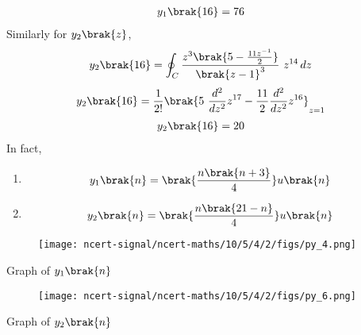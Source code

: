 \documentclass[journal,12pt,twocolumn]{IEEEtran}
\theoremstyle{remark}
\begin{document}
\begin{align}
y_1\brak{16}&=76
\end{align}
Similarly for $y_2\brak{z}$,
\begin{align}
y_2\brak{16}&=\oint_C \frac{z^3\brak{5-\frac{11z^{-1}}{2}}}{\brak{z-1}^3}\ z^{14}\, dz
\end{align}
\begin{align}
y_2\brak{16}&=\frac{1}{2!}\brak{5\ \frac{d^2}{dz^2}z^{17}-\frac{11}{2}\frac{d^2}{dz^2}z^{16}}_{z=1}  
\end{align}
\begin{align}
y_2\brak{16}&=20
\end{align}
In fact,\\
    \begin{enumerate}
    \item
    \begin{align}
        y_1\brak{n}&=\brak{\frac{n\brak{n+3}}{4}}u\brak{n}
    \end{align}
    \item
    \begin{align}
        y_2\brak{n}&=\brak{\frac{n\brak{21-n}}{4}}u\brak{n}
    \end{align}
\end{enumerate}
\begin{figure}[h]
    \centering
    \texttt{[image: ncert-signal/ncert-maths/10/5/4/2/figs/py\_4.png]}
    \label{fig:s1n}
\end{figure}
\begin{center}
    Graph of $y_1\brak{n}$\\[30ex]
\end{center}
\begin{figure}[h]
    \centering
    \texttt{[image: ncert-signal/ncert-maths/10/5/4/2/figs/py\_6.png]}
    \label{s2n}
\end{figure}
\begin{center}
Graph of $y_2\brak{n}$
\end{center}
\end{document}
